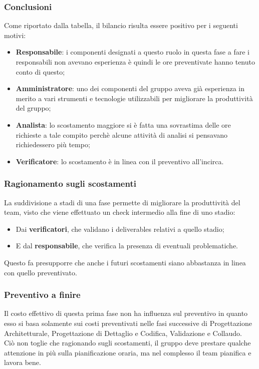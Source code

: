 \subsubsection{Conclusioni}
Come riportato dalla tabella, il bilancio risulta essere positivo per i seguenti motivi:
\begin{itemize}
	\item \textbf{Responsabile}: {i componenti designati a questo ruolo in questa fase a fare i responsabili non avevano esperienza è quindi le ore preventivate hanno tenuto conto di questo; }
	\item \textbf{Amministratore}: {uno dei componenti del gruppo aveva già esperienza in merito a vari strumenti e tecnologie utilizzabili per migliorare la produttività del gruppo;}
	\item \textbf{Analista}: {lo scostamento maggiore si è fatta una sovrastima delle ore richieste a tale compito perchè alcune attività di analisi si pensavano richiedessero più tempo;}
	\item \textbf{Verificatore}: {lo scostamento è in linea con il preventivo all'incirca.}
\end{itemize}

\subsubsection{Ragionamento sugli scostamenti}
La suddivisione a stadi di una fase permette di migliorare la produttività del team, visto che viene effettuato un check intermedio alla fine di uno stadio:
\begin{itemize}
	\item Dai \textbf{verificatori}, che validano i deliverables relativi a quello stadio;
	\item E dal \textbf{responsabile}, che verifica la presenza di eventuali problematiche.
\end{itemize}
Questo fa presupporre che anche i futuri scostamenti siano abbastanza in linea con quello preventivato.
\subsubsection{Preventivo a finire}
Il costo effettivo di questa prima fase non ha influenza sul preventivo in quanto esso si basa solamente sui costi preventivati nelle fasi successive di Progettazione Architetturale, Progettazione di Dettaglio e Codifica, Validazione e Collaudo.\\
Ciò non toglie che ragionando sugli scostamenti, il gruppo deve prestare qualche attenzione in più sulla pianificazione oraria, ma nel complesso il team pianifica e lavora bene.
